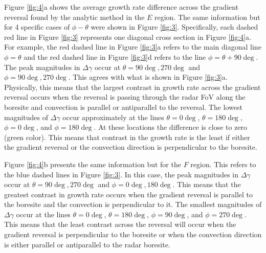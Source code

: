 Figure \ref{fig:4}a shows the average growth rate difference across the gradient reversal found by the analytic method in the \(E\) region.  The same information but for 4 specific cases of \(\phi-\theta\) were shown in Figure \ref{fig:3}.  Specifically, each dashed red line in Figure \ref{fig:3} represents one diagonal cross section in Figure \ref{fig:4}a. For example, the red dashed line in Figure \ref{fig:3}a refers to the main diagonal line \(\phi=\theta\) and the red dashed line in Figure \ref{fig:3}d refers to the line \(\phi=\theta+90\deg\). The peak magnitudes in \(\Delta\gamma\) occur at \(\theta=90\deg,270\deg\) and \(\phi=90\deg,270\deg\).  This agrees with what is shown in Figure \ref{fig:3}a. Physically, this means that the largest contrast in growth rate across the gradient reversal occurs when the reversal is passing through the radar FoV along the boresite and convection is parallel or antiparallel to the reversal. The lowest magnitudes of \(\Delta\gamma\) occur approximately at the lines \(\theta=0\deg\), \(\theta=180\deg\), \(\phi=0\deg\), and \(\phi=180\deg\). At these locations the difference is close to zero (green color). This means that contrast in the growth rate is the least if either the gradient reversal or the convection direction is perpendicular to the boresite.

Figure \ref{fig:4}b presents the same information but for the \(F\) region. This refers to the blue dashed lines in Figure \ref{fig:3}.  In this case, the peak magnitudes in \(\Delta\gamma\) occur at \(\theta=90\deg,270\deg\) and \(\phi=0\deg,180\deg\).  This means that the greatest contrast in growth rate occurs when the gradient reversal is parallel to the boresite and the convection is perpendicular to it.  The smallest magnitudes of \(\Delta\gamma\) occur at the lines \(\theta=0\deg\), \(\theta=180\deg\), \(\phi=90\deg\), and \(\phi=270\deg\). This means that the least contrast across the reversal will occur when the gradient reversal is perpendicular to the boresite or when the convection direction is either parallel or antiparallel to the radar boresite.



